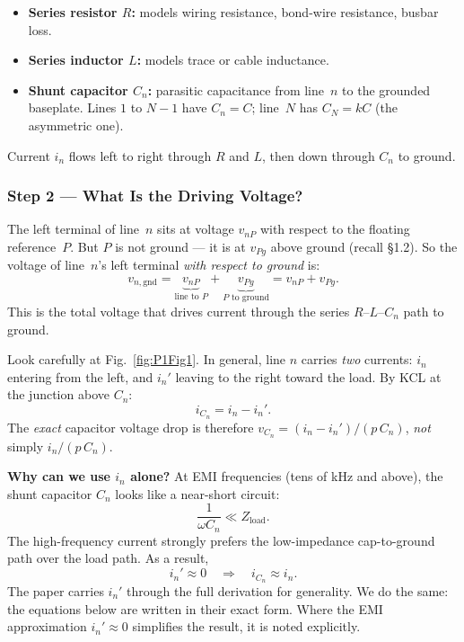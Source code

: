 \begin{circuitbox}
\begin{itemize}
    \item \textbf{Series resistor $R$:} models wiring resistance,
          bond-wire resistance, busbar loss.
    \item \textbf{Series inductor $L$:} models trace or cable
          inductance.
    \item \textbf{Shunt capacitor $C_n$:} parasitic capacitance
          from line~$n$ to the grounded baseplate.
          Lines $1$ to $N-1$ have $C_n = C$;
          line~$N$ has $C_N = kC$ (the asymmetric one).
\end{itemize}
Current $i_n$ flows left to right through $R$ and $L$, then
down through $C_n$ to ground.
\end{circuitbox}

\subsubsection*{Step 2 — What Is the Driving Voltage?}

The left terminal of line~$n$ sits at voltage $v_{nP}$ with
respect to the floating reference~$P$.
But $P$ is not ground — it is at $v_{Pg}$ above ground
(recall \S1.2).  So the voltage of line~$n$'s left terminal
\emph{with respect to ground} is:
\[
    v_{n,\mathrm{gnd}}
    = \underbrace{v_{nP}}_{\text{line to }P}
    + \underbrace{v_{Pg}}_{P\text{ to ground}}
    = v_{nP} + v_{Pg}.
\]
This is the total voltage that drives current through the series
$R$--$L$--$C_n$ path to ground.

\begin{physbox}
Look carefully at Fig.~\ref{fig:P1Fig1}.  In general, line $n$ carries
\emph{two} currents: $i_n$ entering from the left, and $i_n'$ leaving
to the right toward the load.  By KCL at the junction above $C_n$:
\[
    i_{C_n} = i_n - i_n'.
\]
The \emph{exact} capacitor voltage drop is therefore
$v_{C_n} = (i_n - i_n')/(p\,C_n)$, \emph{not} simply $i_n/(p\,C_n)$.

\textbf{Why can we use $i_n$ alone?}  At EMI frequencies (tens of kHz
and above), the shunt capacitor $C_n$ looks like a near-short circuit:
\[
    \frac{1}{\omega C_n} \ll Z_{\mathrm{load}}.
\]
The high-frequency current strongly prefers the low-impedance
cap-to-ground path over the load path.  As a result,
\[
    i_n' \approx 0
    \quad\Longrightarrow\quad
    i_{C_n} \approx i_n.
\]
The paper carries $i_n'$ through the full derivation for generality.
We do the same: the equations below are written in their exact form.
Where the EMI approximation $i_n' \approx 0$ simplifies the result,
it is noted explicitly.
\end{physbox}

